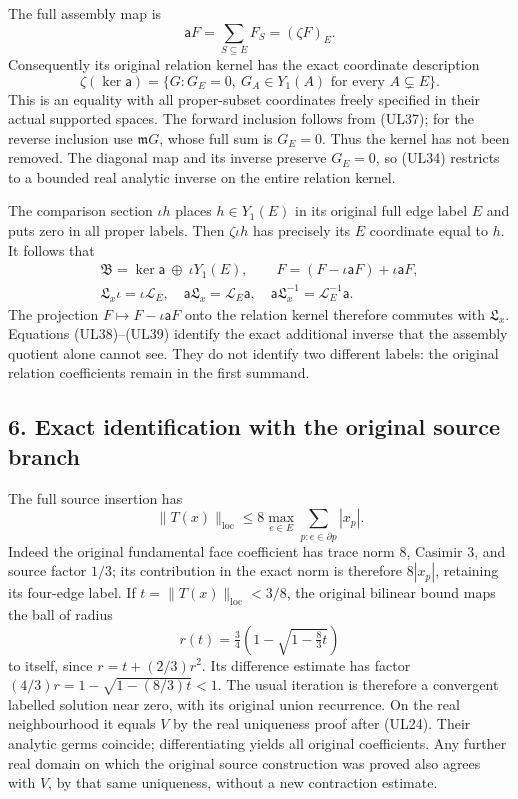 \documentclass[11pt]{article}
\begin{document}
The full assembly map is
\[
 \mathsf aF=\sum_{S\subseteq E}F_S=(\zeta F)_E.
 \tag{UL37}
\]
Consequently its original relation kernel has the exact coordinate description
\[
 \boxed{\zeta(\ker\mathsf a)
       =\{G:G_E=0,\ G_A\in Y_1(A)\text{ for every }A\subsetneq E\}.}
 \tag{UL38}
\]
This is an equality with all proper-subset coordinates freely specified in their actual supported spaces. The forward inclusion follows from (UL37); for the reverse inclusion use \(\mathfrak mG\), whose full sum is \(G_E=0\). Thus the kernel has not been removed. The diagonal map and its inverse preserve \(G_E=0\), so (UL34) restricts to a bounded real analytic inverse on the entire relation kernel.

The comparison section \(\iota h\) places \(h\in Y_1(E)\) in its original full edge label \(E\) and puts zero in all proper labels. Then \(\zeta\iota h\) has precisely its \(E\) coordinate equal to \(h\). It follows that
\[
\begin{gathered}
 \mathfrak B=\ker\mathsf a\ \oplus\ \iota Y_1(E),\qquad
 F=(F-\iota\mathsf aF)+\iota\mathsf aF,\\
 \mathfrak L_x\iota=\iota\mathscr L_E,\quad
 \mathsf a\mathfrak L_x=\mathscr L_E\mathsf a,\quad
 \mathsf a\mathfrak L_x^{-1}=\mathscr L_E^{-1}\mathsf a.
\end{gathered}\tag{UL39}
\]
The projection \(F\mapsto F-\iota\mathsf aF\) onto the relation kernel therefore commutes with \(\mathfrak L_x\). Equations (UL38)–(UL39) identify the exact additional inverse that the assembly quotient alone cannot see. They do not identify two different labels: the original relation coefficients remain in the first summand.

\subsection*{6. Exact identification with the original source branch}

The full source insertion has
\[
 \|T(x)\|_{\mathrm{loc}}
 \le8\max_{e\in E}\sum_{p:e\in\partial p}|x_p|.
 \tag{UL40}
\]
Indeed the original fundamental face coefficient has trace norm \(8\), Casimir \(3\), and source factor \(1/3\); its contribution in the exact norm is therefore \(8|x_p|\), retaining its four-edge label. If \(t=\|T(x)\|_{\mathrm{loc}}<3/8\), the original bilinear bound maps the ball of radius
\[
 r(t)=\tfrac34\left(1-\sqrt{1-\tfrac83t}\right)
 \tag{UL41}
\]
to itself, since \(r=t+(2/3)r^2\). Its difference estimate has factor \((4/3)r=1-\sqrt{1-(8/3)t}<1\). The usual iteration is therefore a convergent labelled solution near zero, with its original union recurrence. On the real neighbourhood it equals \(V\) by the real uniqueness proof after (UL24). Their analytic germs coincide; differentiating yields all original coefficients. Any further real domain on which the original source construction was proved also agrees with \(V\), by that same uniqueness, without a new contraction estimate.
\end{document}
